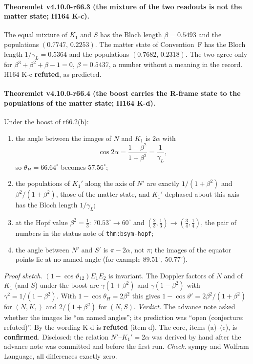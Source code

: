 \paragraph{Theoremlet v4.10.0-r66.3 (the mixture of the two readouts is not the matter state; H164 K-c).}
The equal mixture of \(K_1\) and \(S\) has the Bloch length \(\beta=0.5493\) and the populations \((0.7747,\,0.2253)\).  The matter state of
Convention~F has the Bloch length \(1/\gamma_L=0.5364\) and the populations \((0.7682,\,0.2318)\).  The two agree only for
\(\beta^3+\beta^2+\beta-1=0\), \(\beta=0.5437\), a number without a meaning in the record.  H164 K-c \textbf{refuted}, as predicted.

\paragraph{Theoremlet v4.10.0-r66.4 (the boost carries the R-frame state to the populations of the matter state; H164 K-d).}
Under the boost of r66.2(b):
\begin{enumerate}[leftmargin=2em]
\item[(a)] the angle between the images of \(N\) and \(K_1\) is \(2\alpha\) with
\[
\cos2\alpha=\frac{1-\beta^2}{1+\beta^2}=\frac1{\gamma_L},
\]
so \(\theta_H=66.64^\circ\) becomes \(57.56^\circ\);
\item[(b)] the populations of \(K_1'\) along the axis of \(N'\) are exactly \(1/(1+\beta^2)\) and \(\beta^2/(1+\beta^2)\), those of the matter state,
and \(K_1'\) dephased about this axis has the Bloch length \(1/\gamma_L\);
\item[(c)] at the Hopf value \(\beta^2=\tfrac13\): \(70.53^\circ\to60^\circ\) and \((\tfrac23,\tfrac13)\to(\tfrac34,\tfrac14)\), the pair of numbers in
the status note of \texttt{thm:bsym-hopf};
\item[(d)] the angle between \(N'\) and \(S'\) is \(\pi-2\alpha\), not \(\pi\); the images of the equator points lie at no named angle (for example
\(89.51^\circ\), \(50.77^\circ\)).
\end{enumerate}
\emph{Proof sketch.}  \((1-\cos\vartheta_{12})E_1E_2\) is invariant.  The Doppler factors of \(N\) and of \(K_1\) (and \(S\)) under the boost are
\(\gamma(1+\beta^2)\) and \(\gamma(1-\beta^2)\) with \(\gamma^2=1/(1-\beta^2)\).  With \(1-\cos\theta_H=2\beta^2\) this gives
\(1-\cos\vartheta'=2\beta^2/(1+\beta^2)\) for \((N,K_1)\) and \(2/(1+\beta^2)\) for \((N,S)\).
\emph{Verdict.}  The advance note asked whether the images lie ``on named angles''; its prediction was ``open (conjecture: refuted)''.  By the wording
K-d is \textbf{refuted} (item d).  The core, items (a)--(c), is \textbf{confirmed}.  Disclosed: the relation \(N'\)--\(K_1'=2\alpha\) was derived by hand
after the advance note was committed and before the first run.
\emph{Check.} sympy and Wolfram Language, all differences exactly zero.

